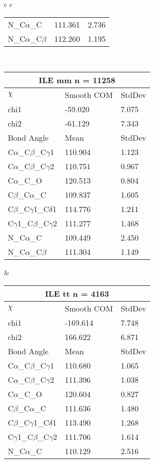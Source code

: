 \begin{longtable}{ c c }
\begin{tabular}{ l l l }
  N\_C$\alpha$\_C & 111.361 & 2.736\\
  N\_C$\alpha$\_C$\beta$ & 112.260 & 1.195\\
  \bottomrule
  \end{tabular}
  \\
  \begin{tabular}{ l l l }
  \toprule
  \multicolumn{3}{c}{ILE \textbf{mm} n = 11258} \\ \toprule
  $\chi$       & Smooth COM & StdDev \\ \midrule
  chi1 & -59.020 & 7.075 \\ 
  chi2 & -61.129 & 7.343 \\ \midrule
  Bond Angle   & Mean     & StdDev \\ \midrule
  C$\alpha$\_C$\beta$\_C$\gamma$1 & 110.904 & 1.123\\
  C$\alpha$\_C$\beta$\_C$\gamma$2 & 110.751 & 0.967\\
  C$\alpha$\_C\_O & 120.513 & 0.804\\
  C$\beta$\_C$\alpha$\_C & 109.837 & 1.605\\
  C$\beta$\_C$\gamma$1\_C$\delta$1 & 114.776 & 1.211\\
  C$\gamma$1\_C$\beta$\_C$\gamma$2 & 111.277 & 1.468\\
  N\_C$\alpha$\_C & 109.449 & 2.450\\
  N\_C$\alpha$\_C$\beta$ & 111.304 & 1.149\\
  \bottomrule
  \end{tabular}
  &
  \begin{tabular}{ l l l }
  \toprule
  \multicolumn{3}{c}{ILE \textbf{tt} n = 4163} \\ \toprule
  $\chi$       & Smooth COM & StdDev \\ \midrule
  chi1 & -169.614 & 7.748 \\ 
  chi2 & 166.622 & 6.871 \\ \midrule
  Bond Angle   & Mean     & StdDev \\ \midrule
  C$\alpha$\_C$\beta$\_C$\gamma$1 & 110.680 & 1.065\\
  C$\alpha$\_C$\beta$\_C$\gamma$2 & 111.396 & 1.038\\
  C$\alpha$\_C\_O & 120.604 & 0.827\\
  C$\beta$\_C$\alpha$\_C & 111.636 & 1.480\\
  C$\beta$\_C$\gamma$1\_C$\delta$1 & 113.490 & 1.268\\
  C$\gamma$1\_C$\beta$\_C$\gamma$2 & 111.706 & 1.614\\
  N\_C$\alpha$\_C & 110.129 & 2.516\\

\end{tabular}
\end{longtable}
